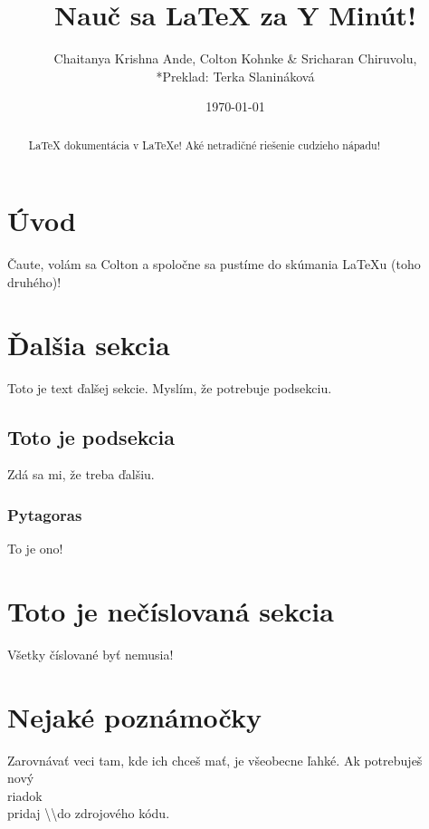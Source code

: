 \documentclass[12pt]{article}
\author{Chaitanya Krishna Ande, Colton Kohnke \& Sricharan Chiruvolu, \\*Preklad: Terka Slanináková}
\date{\today}
\title{Nauč sa LaTeX za Y Minút!}
\begin{document}
 
\maketitle

\renewcommand\abstractname{Abstrakt}

\begin{abstract}
LaTeX dokumentácia v LaTeXe! Aké netradičné riešenie cudzieho nápadu!
\end{abstract}

\section{Úvod}
Čaute, volám sa Colton a spoločne sa pustíme do skúmania LaTeXu (toho druhého)!

\section{Ďalšia sekcia}
Toto je text ďalšej sekcie. Myslím, že potrebuje podsekciu.

\subsection{Toto je podsekcia} %
Zdá sa mi, že treba ďalšiu.

\subsubsection{Pytagoras}
To je ono!
\label{subsec:pytagoras}

\section*{Toto je nečíslovaná sekcia} 
Všetky číslované byť nemusia!

\section{Nejaké poznámočky}
Zarovnávať veci tam, kde ich chceš mať, je všeobecne ľahké. Ak 
potrebuješ \\ nový \\ riadok \\ pridaj \textbackslash\textbackslash do 
zdrojového kódu. \\ 
\end{document}
